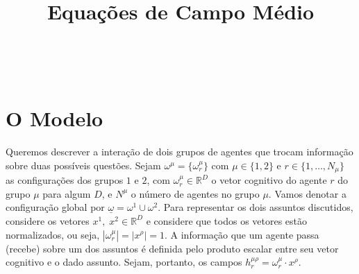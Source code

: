 \documentclass[a4paper, 11pt]{article} %
\title{\textbf{Equações de Campo Médio}}%
\makeatletter
\renewcommand{\maketitle}{ %
\begin{flushright} %
{\LARGE\@title} %

\vspace{50pt} %

{\large\@author} %
\\\@date %

\vspace{40pt} %
\end{flushright}
}
\makeatother
\begin{document}
\maketitle %




\vspace{30pt} %


\section*{O Modelo}

Queremos descrever a interação de dois grupos de agentes que trocam informação
sobre duas possíveis questões. Sejam $ \omega^{\mu}=\{\omega_r^{\mu}\} $ com 
$ \mu \in \{1,2\} $ e $r \in \{1,\ldots, N_{\mu}\}$ as configurações dos grupos
$1$ e $2$, com $\omega_r^{\mu} \in \mathbb{R}^D$ o vetor cognitivo do agente $r$
do grupo $\mu$ para algum $D$, e $N^{\mu}$ o número de agentes no grupo $\mu$.
Vamos denotar a configuração global por
$\underline \omega = \omega^1 \cup \omega^2$. Para representar os
dois assuntos discutidos, considere os vetores $x^1,\;x^2 \in \mathbb{R}^D$ e
considere que todos os vetores estão normalizados, ou seja, 
$|\omega^{\mu}_r|=|x^{\rho}|=1$. A informação que um agente passa (recebe) sobre 
um dos assuntos é definida pelo produto escalar entre seu vetor cognitivo e o 
dado assunto. Sejam, portanto, os campos 
$h_r^{\mu\rho}=\omega_r^{\mu} \cdot x^{\rho}$.  
\end{document}
